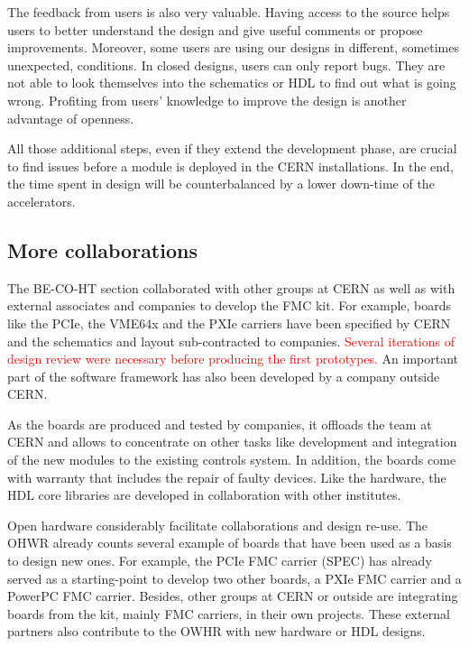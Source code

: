 \documentclass{JAC2003}
\begin{document}
The feedback from users is also very valuable.
Having access to the source helps users to better understand the design and give useful comments or propose improvements.
Moreover, some users are using our designs in different, sometimes unexpected, conditions.
In closed designs, users can only report bugs.
They are not able to look themselves into the schematics or HDL to find out what is going wrong.
Profiting from users' knowledge to improve the design is another advantage of openness.

All those additional steps, even if they extend the development phase, are crucial to find issues before a module is deployed in the CERN installations.
In the end, the time spent in design will be counterbalanced by a lower down-time of the accelerators.



\subsection{More collaborations}
The BE-CO-HT section collaborated with other groups at CERN as well as with external associates and companies to develop the FMC kit.
For example, boards like the PCIe, the VME64x and the PXIe carriers have been specified by CERN and the schematics and layout sub-contracted to companies.
\textcolor{red}{Several iterations of design review were necessary before producing the first prototypes.}
An important part of the software framework has also been developed by a company outside CERN.

As the boards are produced and tested by companies, it offloads the team at CERN and allows to concentrate on other tasks like development and integration of the new modules to the existing controls system.
In addition, the boards come with warranty that includes the repair of faulty devices.
Like the hardware, the HDL core libraries are developed in collaboration with other institutes.

Open hardware considerably facilitate collaborations and design re-use.
The OHWR already counts several example of boards that have been used as a basis to design new ones.
For example, the PCIe FMC carrier (SPEC) has already served as a starting-point to develop two other boards, a PXIe FMC carrier and a PowerPC FMC carrier.
Besides, other groups at CERN or outside are integrating boards from the kit, mainly FMC carriers, in their own projects.
These external partners also contribute to the OWHR with new hardware or HDL designs.
\end{document}
